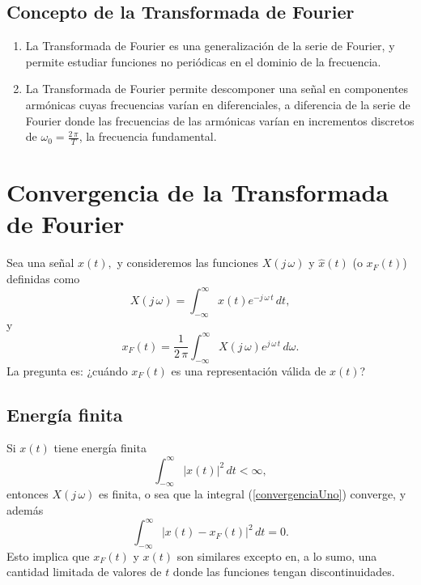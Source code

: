 \documentclass[11pt,a4paper,openany]{book}
\begin{document}
\subsection{Concepto de la Transformada de Fourier}

\begin{enumerate}
	
	\item La Transformada de Fourier es una generalización de la serie de Fourier, y permite estudiar funciones no periódicas en el dominio de la frecuencia.
	\item La Transformada de Fourier permite descomponer una señal en componentes armónicas cuyas frecuencias varían en diferenciales, a diferencia de la serie de Fourier donde las frecuencias de las armónicas varían en incrementos discretos de $\omega_{0} = \frac{2 \, \pi}{T}$, la frecuencia fundamental.
\end{enumerate}

\section{Convergencia de la Transformada de Fourier}

Sea una señal $x(t),$ y consideremos las funciones $X(j \, \omega)$ y $\hat{x}(t)$ (o $x_F(t)$) definidas como 
\begin{equation}
	X(j \, \omega) = \int_{-\infty}^{\infty} x(t) e^{-j \, \omega \, t} \, dt,  \label{convergenciaUno}
\end{equation}
y 
\begin{equation}
	x_{F}(t) = \frac{1}{2 \, \pi} \int_{-\infty}^{\infty} X(j \, \omega) e^{j \, \omega \, t} \, d\omega .
\end{equation}
La pregunta es: ¿cuándo $x_{F}(t)$ es una representación válida de $x(t)$?

\subsection{Energía finita}

Si $x(t)$ tiene energía finita 
\begin{equation}
	\int_{-\infty}^{\infty} |x(t)|^{2} \, dt < \infty ,
\end{equation}
entonces $X(j \, \omega)$ es finita, o sea que la integral (\ref{convergenciaUno}) converge, y además 
\begin{equation}
	\int_{-\infty}^{\infty} |x(t) - x_{F}(t)|^{2} \, dt = 0.
\end{equation}
Esto implica que $x_{F}(t)$ y $x(t)$ son similares excepto en, a lo sumo, una cantidad limitada de valores de $t$ donde las funciones tengan discontinuidades.
\end{document}
